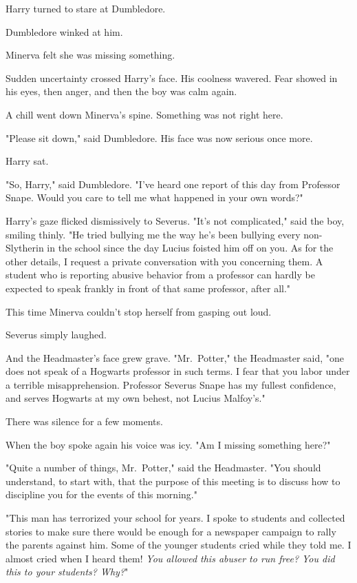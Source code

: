 Harry turned to stare at Dumbledore.

Dumbledore winked at him.

Minerva felt she was missing something.

Sudden uncertainty crossed Harry's face. His coolness wavered. Fear showed in
his eyes, then anger, and then the boy was calm again.

A chill went down Minerva's spine. Something was not right here.

"Please sit down," said Dumbledore. His face was now serious once more.

Harry sat.

"So, Harry," said Dumbledore. "I've heard one report of this day from Professor
Snape. Would you care to tell me what happened in your own words?"

Harry's gaze flicked dismissively to Severus. "It's not complicated," said the
boy, smiling thinly. "He tried bullying me the way he's been bullying every
non-Slytherin in the school since the day Lucius foisted him off on you. As for
the other details, I request a private conversation with you concerning them. A
student who is reporting abusive behavior from a professor can hardly be
expected to speak frankly in front of that same professor, after all."

This time Minerva couldn't stop herself from gasping out loud.

Severus simply laughed.

And the Headmaster's face grew grave. "Mr.~Potter," the Headmaster said, "one
does not speak of a Hogwarts professor in such terms. I fear that you labor
under a terrible misapprehension. Professor Severus Snape has my fullest
confidence, and serves Hogwarts at my own behest, not Lucius Malfoy's."

There was silence for a few moments.

When the boy spoke again his voice was icy. "Am I missing something here?"

"Quite a number of things, Mr.~Potter," said the Headmaster. "You should
understand, to start with, that the purpose of this meeting is to discuss how
to discipline you for the events of this morning."

"This man has terrorized your school for years. I spoke to students and
collected stories to make sure there would be enough for a newspaper campaign
to rally the parents against him. Some of the younger students cried while they
told me. I almost cried when I heard them! \emph{You allowed this abuser to run
free? You did this to your students? Why?}"


